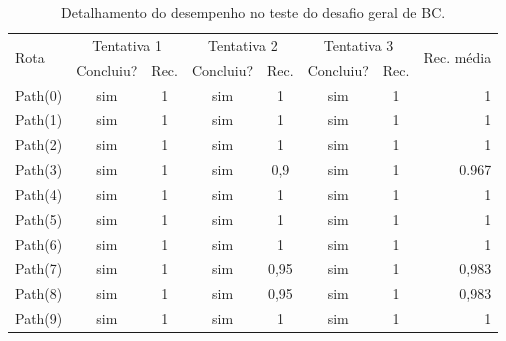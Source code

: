 \begin{table}[htpb]
    \centering
    \caption{Detalhamento do desempenho no teste do desafio geral de BC.}
    \label{resultado-tabela-geral-bc}
    \begin{tabular}{|l|c|c|c|c|c|c|r|}
         \hline
         \multirow{2}{*}{Rota} & \multicolumn{2}{c|}{Tentativa 1}  & \multicolumn{2}{c|}{Tentativa 2} & \multicolumn{2}{c|}{Tentativa 3} & \multirow{2}{*}{Rec. média} \\ \cline{2-7}
                               & \small{Concluiu?}  & \small{Rec.} & \small{Concluiu?} &\small{Rec.} & \small{Concluiu?} &\small{Rec.} &                               \\ \hline
            Path(0)   &      sim        &   1             &    sim          &      1        &    sim          &      1        &      1                 \\ \hline
            Path(1)   &      sim        &   1             &    sim          &      1        &    sim          &      1        &      1                 \\ \hline
            Path(2)   &      sim        &   1             &    sim          &      1        &    sim          &      1        &      1                 \\ \hline
            Path(3)   &      sim        &   1             &    sim          &      0,9      &    sim          &      1        &      0.967             \\ \hline
            Path(4)   &      sim        &   1             &    sim          &      1        &    sim          &      1        &      1                 \\ \hline
            Path(5)   &      sim        &   1             &    sim          &      1        &    sim          &      1        &      1                 \\ \hline
            Path(6)   &      sim        &   1             &    sim          &      1        &    sim          &      1        &      1                 \\ \hline
            Path(7)   &      sim        &   1             &    sim          &      0,95     &    sim          &      1        &      0,983             \\ \hline
            Path(8)   &      sim        &   1             &    sim          &      0,95     &    sim          &      1        &      0,983             \\ \hline
            Path(9)   &      sim        &   1             &    sim          &      1        &    sim          &      1        &      1                 \\ \hline

\end{tabular}
\end{table}
